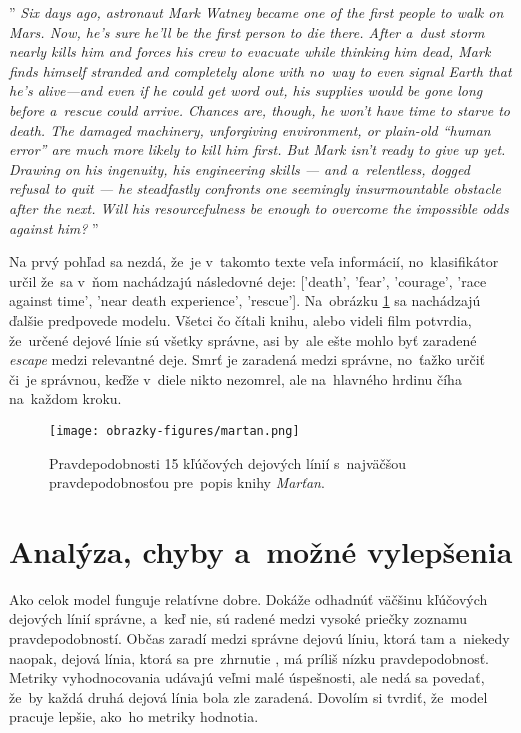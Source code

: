 \noindent''\textit{
Six days ago, astronaut Mark Watney became one of the first people to walk on Mars. Now, he’s sure he’ll be the first person to die there. After a~dust storm nearly kills him and forces his crew to evacuate while thinking him dead, Mark finds himself stranded and completely alone with no~way to even signal Earth that he’s alive—and even if he could get word out, his supplies would be gone long before a~rescue could arrive. Chances are, though, he won’t have time to starve to death. The damaged machinery, unforgiving environment, or plain-old “human error” are much more likely to kill him first. But Mark isn’t ready to give up yet. Drawing on his ingenuity, his engineering skills — and a~relentless, dogged refusal to quit — he steadfastly confronts one seemingly insurmountable obstacle after the next. Will his resourcefulness be enough to overcome the impossible odds against him?
}''

Na prvý pohľad sa nezdá, že~je v~takomto texte veľa informácií, no~klasifikátor určil že~sa v~ňom nachádzajú následovné deje: ['death', 'fear', 'courage', 'race against time', 'near death experience', 'rescue']. Na~obrázku \ref{martan} sa nachádzajú ďalšie predpovede modelu. Všetci čo čítali knihu, alebo videli film potvrdia, že~určené dejové línie sú všetky správne, asi by~ale ešte mohlo byť zaradené \textit{escape} medzi relevantné deje. Smrť je zaradená medzi správne, no~ťažko určiť či~je správnou, keďže v~diele nikto nezomrel, ale na~hlavného hrdinu číha na~každom kroku. 

\begin{figure}[ht!]
	\centering
	\texttt{[image: obrazky-figures/martan.png]}
	\caption{Pravdepodobnosti 15 kľúčových dejových línií s~najväčšou pravdepodobnosťou pre~popis knihy \textit{Marťan}.}
	\label{martan}
\end{figure}

\pagebreak
\section{Analýza, chyby a~možné vylepšenia}

Ako celok model funguje relatívne dobre. Dokáže odhadnúť väčšinu kľúčových dejových línií správne, a~keď nie, sú radené medzi vysoké priečky zoznamu pravdepodobností. Občas zaradí medzi správne dejovú líniu, ktorá tam  a~niekedy naopak, dejová línia, ktorá sa pre~zhrnutie , má príliš nízku pravdepodobnosť. Metriky vyhodnocovania udávajú veľmi malé úspešnosti, ale nedá sa povedať, že~by každá druhá dejová línia bola zle zaradená. Dovolím si tvrdiť, že~model pracuje lepšie, ako~ho metriky hodnotia. 

